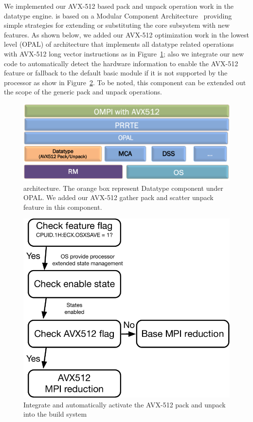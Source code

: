 \documentclass[conference]{IEEEtran}
\begin{document}
We implemented our AVX-512 based pack and unpack operation work in the \ompi
datatype engine. \ompi is based on a Modular Component
Architecture~\cite{dong_prrte,gabriel04ompi} providing simple strategies for
extending or substituting the core subsystem with new features. As shown below,
we added our AVX-512 optimization work in the lowest level (OPAL) of \ompi
architecture that implements all datatype related operations with AVX-512 long
vector instructions as in Figure~\ref{fig:avx_mca}; also we integrate our new
code to automatically detect the hardware information to enable the AVX-512
feature or fallback to the default basic module if it is not supported by the
processor as show in Figure~\ref{fig:512flow}. To be noted, this component can
be extended out the scope of the generic pack and unpack operations.
%

\begin{figure}[h]
    \centering
    \includegraphics[width=\linewidth]{ompi-mca.png}
    \caption{\ompi architecture. The orange box represent Datatype component under OPAL. We added our AVX-512 gather pack and scatter unpack feature in this component.}
    \label{fig:avx_mca}
\end{figure}

\begin{figure}[h]
    \centering
    \includegraphics[scale=.45]{512-flow.pdf}
    \caption{Integrate and automatically activate the AVX-512 pack and unpack into the \ompi build system}
    \label{fig:512flow}
\end{figure}
\end{document}

